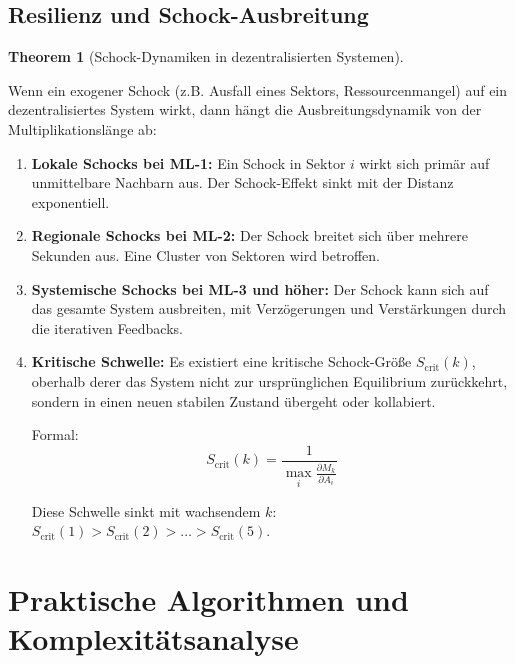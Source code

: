 \documentclass[a4paper,12pt]{article}
\theoremstyle{definition}
\newtheorem{theorem}{Theorem}
\begin{document}
\subsection{Resilienz und Schock-Ausbreitung}

\begin{theorem}[Schock-Dynamiken in dezentralisierten Systemen]
\label{thm:schock_dynamik}

Wenn ein exogener Schock (z.B. Ausfall eines Sektors, Ressourcenmangel) auf ein dezentralisiertes System wirkt, dann hängt die Ausbreitungsdynamik von der Multiplikationslänge ab:

\begin{enumerate}

\item \textbf{Lokale Schocks bei ML-1:} Ein Schock in Sektor $i$ wirkt sich primär auf unmittelbare Nachbarn aus. Der Schock-Effekt sinkt mit der Distanz exponentiell.

\item \textbf{Regionale Schocks bei ML-2:} Der Schock breitet sich über mehrere Sekunden aus. Eine Cluster von Sektoren wird betroffen.

\item \textbf{Systemische Schocks bei ML-3 und höher:} Der Schock kann sich auf das gesamte System ausbreiten, mit Verzögerungen und Verstärkungen durch die iterativen Feedbacks.

\item \textbf{Kritische Schwelle:} Es existiert eine kritische Schock-Größe $S_{\text{crit}}(k)$, oberhalb derer das System nicht zur ursprünglichen Equilibrium zurückkehrt, sondern in einen neuen stabilen Zustand übergeht oder kollabiert.

Formal:
\begin{equation}
S_{\text{crit}}(k) = \frac{1}{\max_i \frac{\partial M_k}{\partial A_i}}
\end{equation}

Diese Schwelle sinkt mit wachsendem $k$: $S_{\text{crit}}(1) > S_{\text{crit}}(2) > \ldots > S_{\text{crit}}(5)$.

\end{enumerate}

\end{theorem}

\section{Praktische Algorithmen und Komplexitätsanalyse}
\end{document}
